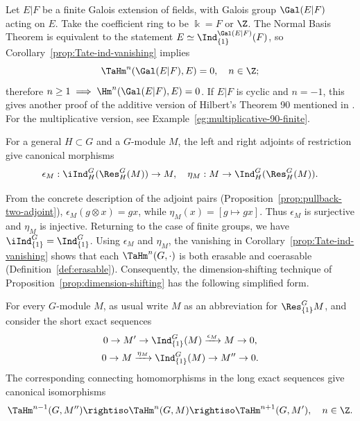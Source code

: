 \begin{example}\label{eg:additive-90-finite}
	Let $E|F$ be a finite Galois extension of fields, with Galois group
	$\Gal(E|F)$ acting on $E$. Take the coefficient ring to be
	$\Bbbk=F$ or $\Z$. The Normal Basis Theorem
	\cite[Theorem 9.5.6]{Li1} is equivalent to the statement
	$E\simeq\Ind^{\Gal(E|F)}_{\{1\}}(F)$, so
	Corollary~\ref{prop:Tate-ind-vanishing} implies
	\[ \TaHm^n(\Gal(E|F), E) = 0, \quad n \in \Z; \]
	therefore $n\geq1\implies\Hm^n(\Gal(E|F),E)=0$. If $E|F$ is cyclic and
	$n=-1$, this gives another proof of the additive version of Hilbert's
	Theorem 90 mentioned in \cite[Theorem 9.6.10]{Li1}. For the
	multiplicative version, see Example~\ref{eg:multiplicative-90-finite}.
\end{example}

For a general $H\subset G$ and a $G$-module $M$, the left and right adjoints
of restriction give canonical morphisms
\[ \epsilon_M: \iInd^G_H(\Res^G_H(M)) \to M, \quad \eta_M: M \to \Ind^G_H(\Res^G_H(M)). \]

From the concrete description of the adjoint pairs
(Proposition~\ref{prop:pullback-two-adjoint}),
$\epsilon_M(g\otimes x)=gx$, while $\eta_M(x)=[g\mapsto gx]$.
Thus $\epsilon_M$ is surjective and $\eta_M$ is injective. Returning to the
case of finite groups, we have
$\iInd^G_{\{1\}}=\Ind^G_{\{1\}}$. Using $\epsilon_M$ and $\eta_M$, the
vanishing in Corollary~\ref{prop:Tate-ind-vanishing} shows that each
$\TaHm^n(G,\cdot)$ is both erasable and coerasable
(Definition~\ref{def:erasable}). Consequently, the dimension-shifting
technique of Proposition~\ref{prop:dimension-shifting} has the following
simplified form.

\begin{corollary}\label{prop:Tate-dim-shift}
	For every $G$-module $M$, as usual write $M$ as an abbreviation for
	$\Res^G_{\{1\}}M$, and consider the short exact sequences
	\begin{gather*}
		0 \to M' \to \Ind^G_{\{1\}}(M) \xrightarrow{\epsilon_M} M \to 0, \\
		0 \to M \xrightarrow{\eta_M} \Ind^G_{\{1\}}(M) \to M'' \to 0.
	\end{gather*}
	The corresponding connecting homomorphisms in the long exact sequences
	give canonical isomorphisms
	\[ \TaHm^{n-1}(G, M'') \rightiso \TaHm^n(G, M) \rightiso \TaHm^{n+1}(G, M'), \quad n \in \Z. \]
\end{corollary}

